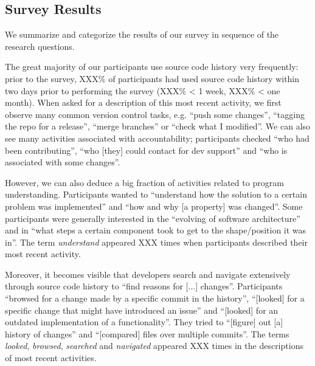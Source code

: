 \subsection{Survey Results}
\label{sec:survey-results}

We summarize and categorize the results of our survey in sequence of the research questions.




\noindent
The great majority of our participants use source code history very frequently: prior to the survey, XXX\% of participants had used source code history within two days prior to performing the survey (XXX\% < 1 week, XXX\% < one month). When asked for a description of this most recent activity, we first observe many common version control tasks, e.g. ``push some changes'', ``tagging the repo for a release'', ``merge branches'' or ``check what I modified''. We can also see many activities associated with accountability; participants checked ``who had been contributing'', ``who [they] could contact for dev support'' and ``who is associated with some changes''.

However, we can also deduce a big fraction of activities related to program understanding. Participants wanted to ``understand how the solution to a certain problem was implemented'' and ``how and why [a property] was changed''. Some participants were generally interested in the ``evolving of software architecture'' and in ``what steps a certain component took to get to the shape/position it was in''. The term \textit{understand} appeared XXX times when participants described their most recent activity.

Moreover, it becomes visible that developers search and navigate extensively through source code history to ``find reasons for [...] changes''. Participants ``browsed for a change made by a specific commit in the history'', ``[looked] for a specific change that might have introduced an issue'' and ``[looked] for an outdated implementation of a functionality''. They tried to ``[figure] out [a] history of changes'' and ``[compared] files over multiple commits''. The terms \textit{looked}, \textit{browsed}, \textit{searched} and \textit{navigated} appeared XXX times in the descriptions of most recent activities.

